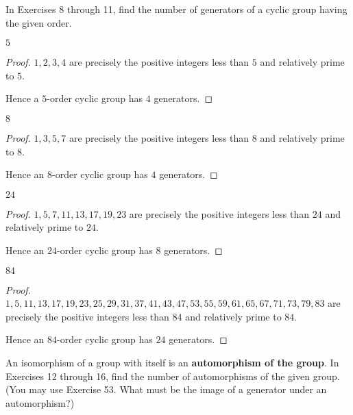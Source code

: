 In Exercises 8 through 11, find the number of generators of a cyclic group having the given order.

\newpage
\begin{exercise}
    $5$
\end{exercise}

\begin{proof}
    $1, 2, 3, 4$ are precisely the positive integers less than $5$ and relatively prime to $5$.

    Hence a $5$-order cyclic group has $4$ generators.
\end{proof}

\newpage
\begin{exercise}
    $8$
\end{exercise}

\begin{proof}
    $1, 3, 5, 7$ are precisely the positive integers less than $8$ and relatively prime to $8$.

    Hence an $8$-order cyclic group has $4$ generators.
\end{proof}

\newpage
\begin{exercise}
    $24$
\end{exercise}

\begin{proof}
    $1, 5, 7, 11, 13, 17, 19, 23$ are precisely the positive integers less than $24$ and relatively prime to $24$.

    Hence an $24$-order cyclic group has $8$ generators.
\end{proof}

\newpage
\begin{exercise}
    $84$
\end{exercise}

\begin{proof}
    $1, 5, 11, 13, 17, 19, 23, 25, 29, 31, 37, 41, 43, 47, 53, 55, 59, 61, 65, 67, 71, 73, 79, 83$ are precisely the positive integers less than $84$ and relatively prime to $84$.

    Hence an $84$-order cyclic group has $24$ generators.
\end{proof}

An isomorphism of a group with itself is an \textbf{automorphism of the group}. In Exercises 12 through 16, find the number of automorphisms of the given group. (You may use Exercise 53. What must be the image of a generator under an automorphism?)

